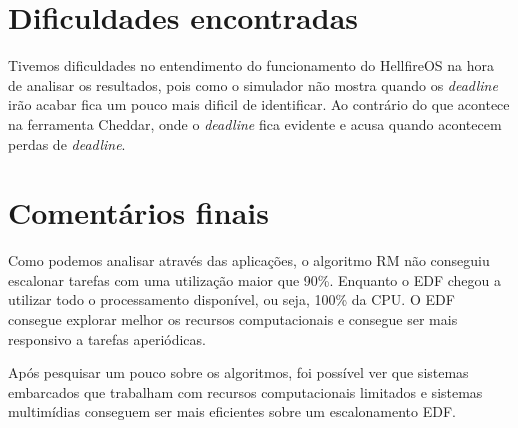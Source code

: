 \documentclass[12pt]{article}
\begin{document}
\section{Dificuldades encontradas} 
Tivemos dificuldades no entendimento do funcionamento do HellfireOS na hora de analisar os resultados, pois como o simulador não mostra quando os \textit{deadline} irão acabar fica um pouco mais dificil de identificar. Ao contrário do que acontece na ferramenta Cheddar, onde o \textit{deadline} fica evidente e acusa quando acontecem perdas de \textit{deadline}. 

\section{Comentários finais} 

Como podemos analisar através das aplicações, o algoritmo RM não conseguiu escalonar tarefas com uma utilização maior que 90\%. Enquanto o EDF chegou a utilizar todo o processamento disponível, ou seja, 100\% da CPU. O EDF consegue explorar melhor os recursos computacionais e consegue ser mais responsivo a tarefas aperiódicas. 

Após pesquisar um pouco sobre os algoritmos, foi possível ver que sistemas embarcados que trabalham com recursos computacionais limitados e sistemas multimídias conseguem ser mais eficientes sobre um escalonamento EDF.
\end{document}
